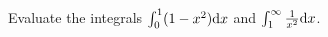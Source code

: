\begin{homeworkProblem}[6]
  Evaluate the integrals
  \(\int_0^1 (1 - x^2) \mathrm{d}x\)
  and
  \(\int_1^{\infty} \frac{1}{x^2} \mathrm{d}x\).
\end{homeworkProblem}